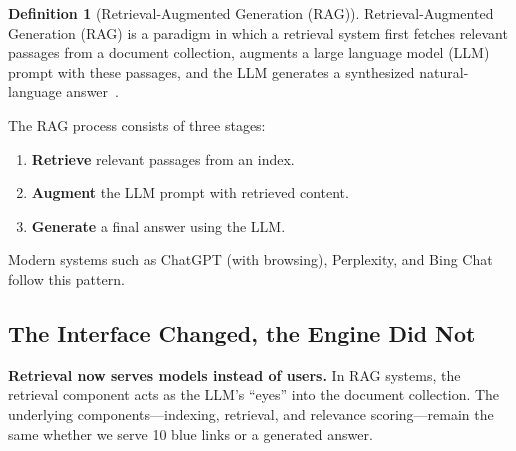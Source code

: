 \documentclass[11pt,a4paper]{article}
\theoremstyle{definition}
\newtheorem{definition}{Definition}[section]
\theoremstyle{plain}
\begin{document}
\begin{center}

\end{center}

\begin{definition}[Retrieval-Augmented Generation (RAG)]
\label{def:rag}
Retrieval-Augmented Generation (RAG) is a paradigm in which a retrieval system first fetches relevant passages from a document collection, augments a large language model (LLM) prompt with these passages, and the LLM generates a synthesized natural-language answer~\cite{lewis2020rag}.
\end{definition}

\begin{center}

\end{center}

The RAG process consists of three stages:
\begin{enumerate}
    \item \textbf{Retrieve} relevant passages from an index.
    \item \textbf{Augment} the LLM prompt with retrieved content.
    \item \textbf{Generate} a final answer using the LLM.
\end{enumerate}

Modern systems such as ChatGPT (with browsing), Perplexity, and Bing Chat follow this pattern.

\subsection{The Interface Changed, the Engine Did Not}

\begin{center}
\begin{center}
\begin{minipage}{0.45\textwidth}
\centering

\end{minipage}
\hfill
\begin{minipage}{0.45\textwidth}
\centering

\end{minipage}
\end{center}
\end{center}

\begin{keytakeaway}
\textbf{Retrieval now serves models instead of users.} In RAG systems, the retrieval component acts as the LLM's ``eyes'' into the document collection. The underlying components---indexing, retrieval, and relevance scoring---remain the same whether we serve 10 blue links or a generated answer.
\end{keytakeaway}
\end{document}
